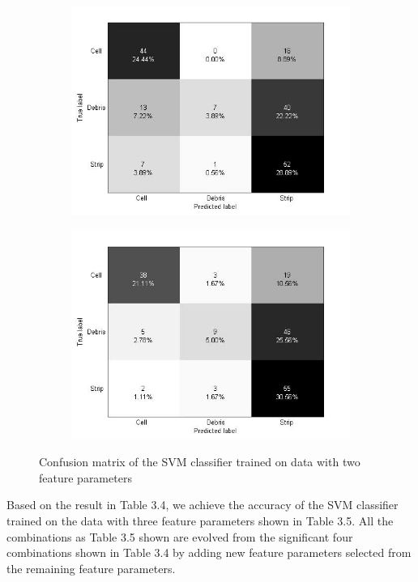 \begin{figure}[!h]
\begin{subfigure}[b]{0.3\textwidth}
    \includegraphics[width=\textwidth]{confusion_matrix/fig3_3e.jpg}
    \caption{}
  \end{subfigure}
  \begin{subfigure}[b]{0.3\textwidth}
    \includegraphics[width=\textwidth]{confusion_matrix/fig3_3f.jpg}
    \caption{}
  \end{subfigure}
  \caption{Confusion matrix of the SVM classifier trained on data with two feature parameters}
\end{figure}
Based on the result in Table 3.4, we achieve the accuracy of the SVM classifier trained on the data with three feature parameters shown in Table 3.5. All the combinations as Table 3.5 shown are evolved from the significant four combinations shown in Table 3.4 by adding new feature parameters selected from the remaining feature parameters. 
